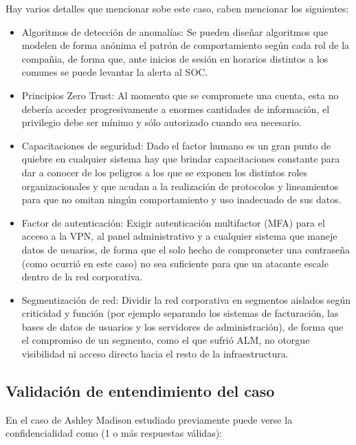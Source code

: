 \begin{respuesta}

  Hay varios detalles que mencionar sobe este caso, caben mencionar los siguientes:

  \begin{itemize}
    \item Algoritmos de detección de anomalías: Se pueden diseñar algoritmos que modelen de forma anónima el patrón de comportamiento según cada rol de la compañia, de forma que, ante inicios de sesión en horarios distintos a los comunes se puede levantar la alerta al SOC.
    \item Principios Zero Trust: Al momento que se compromete una cuenta, esta no debería acceder progresivamente a enormes cantidades de información, el privilegio debe ser mínimo y sólo autorizado cuando sea necesario.
    \item Capacitaciones de seguridad: Dado el factor humano es un gran punto de quiebre en cualquier sistema hay que brindar capacitaciones constante para dar a conocer de los peligros a los que se exponen los distintos roles organizacionales y que acudan a la realización de protocolos y lineamientos para que no omitan ningún comportamiento y uso inadecuado de sus datos.
    \item Factor de autenticación: Exigir autenticación multifactor (MFA) para el acceso a la VPN, al panel administrativo y a cualquier sistema que maneje datos de usuarios, de forma que el solo hecho de comprometer una contraseña (como ocurrió en este caso) no sea suficiente para que un atacante escale dentro de la red corporativa.
    \item Segmentización de red: Dividir la red corporativa en segmentos aislados según criticidad y función (por ejemplo separando los sistemas de facturación, las bases de datos de usuarios y los servidores de administración), de forma que el compromiso de un segmento, como el que sufrió ALM, no otorgue visibilidad ni acceso directo hacia el resto de la infraestructura.
  \end{itemize}

\end{respuesta}

\subsection*{Validación de entendimiento del caso}

\begin{mcq}{En el caso de Ashley Madison estudiado previamente puede verse la
  confidencialidad como (1 o más respuestas válidas):}
\end{mcq}

